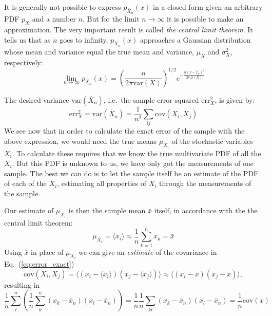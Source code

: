 \documentclass[graybox,sectrefs,envcountresetchap,open=right]{svmonodo}
\begin{document}
It is generally not possible to express $p_{\overline X_n}(x)$ in a
closed form given an arbitrary PDF $p_X^{\phantom X}$ and a number
$n$. But for the limit $n\to\infty$ it is possible to make an
approximation. The very important result is called \emph{the central limit theorem}. It tells us that as $n$ goes to infinity,
$p_{\overline X_n}(x)$ approaches a Gaussian distribution whose mean
and variance equal the true mean and variance, $\mu_{X}^{\phantom X}$
and $\sigma_{X}^{2}$, respectively:
\begin{equation}
\lim_{n\to\infty} p_{\overline X_n}(x) =
\left(\frac{n}{2\pi\mathrm{var}(X)}\right)^{1/2}
e^{-\frac{n(x-\bar x_n)^2}{2\mathrm{var}(X)}}
\label{eq:central_limit_gaussian}
\end{equation}





The desired variance
$\mathrm{var}(\overline X_n)$, i.e.~the sample error squared
$\mathrm{err}_X^2$, is given by:
\begin{equation}
\mathrm{err}_X^2 = \mathrm{var}(\overline X_n) = \frac{1}{n^2}
\sum_{ij} \mathrm{cov}(X_i, X_j)
\label{eq:error_exact}
\end{equation}
We see now that in order to calculate the exact error of the sample
with the above expression, we would need the true means
$\mu_{X_i}^{\phantom X}$ of the stochastic variables $X_i$. To
calculate these requires that we know the true multivariate PDF of all
the $X_i$. But this PDF is unknown to us, we have only got the measurements of
one sample. The best we can do is to let the sample itself be an
estimate of the PDF of each of the $X_i$, estimating all properties of
$X_i$ through the measurements of the sample.






Our estimate of $\mu_{X_i}^{\phantom X}$ is then the sample mean $\bar x$
itself, in accordance with the the central limit theorem:
\[
\mu_{X_i}^{\phantom X} = \langle x_i\rangle \approx \frac{1}{n}\sum_{k=1}^n x_k = \bar x
\]
Using $\bar x$ in place of $\mu_{X_i}^{\phantom X}$ we can give an
\emph{estimate} of the covariance in Eq.~(\ref{eq:error_exact})
\[
\mathrm{cov}(X_i, X_j) = \langle (x_i-\langle x_i\rangle)(x_j-\langle x_j\rangle)\rangle
\approx\langle (x_i - \bar x)(x_j - \bar{x})\rangle,
\]
resulting in
\[ 
\frac{1}{n} \sum_{l}^n \left(\frac{1}{n}\sum_{k}^n (x_k -\bar x_n)(x_l - \bar x_n)\right)=\frac{1}{n}\frac{1}{n} \sum_{kl} (x_k -\bar x_n)(x_l - \bar x_n)=\frac{1}{n}\mathrm{cov}(x)
\]
\end{document}
